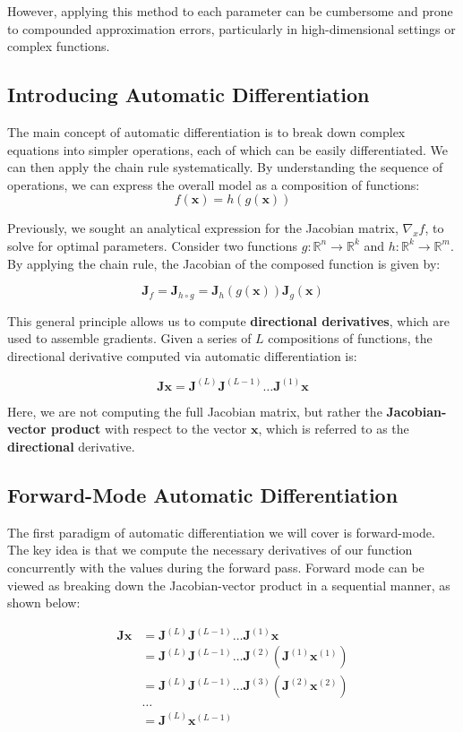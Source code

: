However, applying this method to each parameter can be cumbersome and prone to compounded approximation errors, particularly in high-dimensional settings or complex functions.


\subsection{Introducing Automatic Differentiation}
The main concept of automatic differentiation is to break down complex equations into simpler operations, each of which can be easily differentiated. We can then apply the chain rule systematically. By understanding the sequence of operations, we can express the overall model as a composition of functions:
\[
    f(\bm{x}) = h(g(\bm{x}))
\]


Previously, we sought an analytical expression for the Jacobian matrix, \( \nabla_x f \), to solve for optimal parameters. Consider two functions \( g: \mathbb{R}^n \to \mathbb{R}^k \) and \( h: \mathbb{R}^k \to \mathbb{R}^m \). By applying the chain rule, the Jacobian of the composed function is given by:

\[
    \bm{J}_f = \bm{J}_{h \circ g} = \bm{J}_h(g(\bm{x})) \bm{J}_g(\bm{x})
\]

This general principle allows us to compute \textbf{directional derivatives}, which are used to assemble gradients. Given a series of \( L \) compositions of functions, the directional derivative computed via automatic differentiation is:

\[
    \bm{J} \bm{x} = \bm{J}^{(L)} \bm{J}^{(L-1)} \dots \bm{J}^{(1)} \bm{x}
\]

Here, we are not computing the full Jacobian matrix, but rather the \textbf{Jacobian-vector product} with respect to the vector \( \bm{x} \), which is referred to as the \textbf{directional }derivative.

\subsection{Forward-Mode Automatic Differentiation}

The first paradigm of automatic differentiation we will cover is forward-mode. The key idea is that we compute the necessary derivatives of our function concurrently with the values during the forward pass. Forward mode can be viewed as breaking down the Jacobian-vector product in a sequential manner, as shown below:

\begin{align}
    \bm{J} \bm{x} & = \bm{J}^{(L)} \bm{J}^{(L-1)} \dots \bm{J}^{(1)} \bm{x}                      \\
                  & = \bm{J}^{(L)} \bm{J}^{(L-1)} \dots \bm{J}^{(2)} (\bm{J}^{(1)} \bm{x}^{(1)}) \\
                  & = \bm{J}^{(L)} \bm{J}^{(L-1)} \dots \bm{J}^{(3)} (\bm{J}^{(2)} \bm{x}^{(2)}) \\
                  & \dots                                                                        \\
                  & = \bm{J}^{(L)} \bm{x}^{(L-1)}
\end{align}

